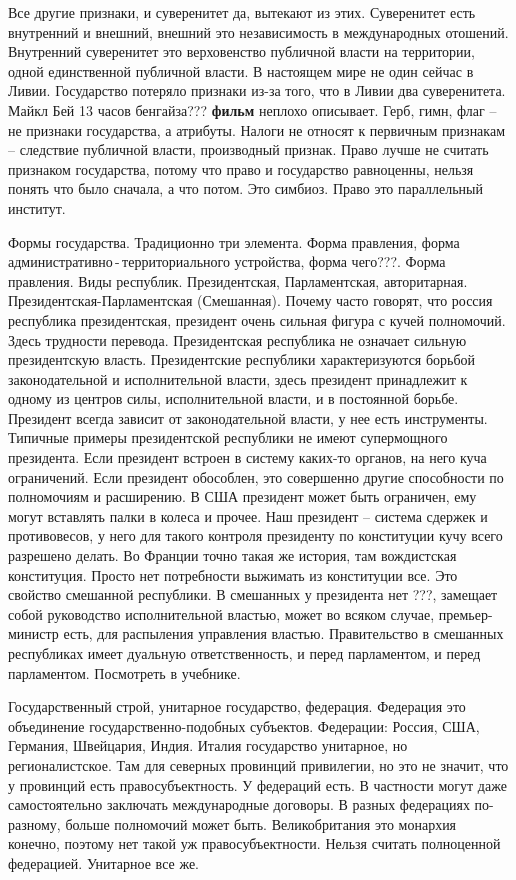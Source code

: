 \documentclass[a4paper, 12pt]{article}
\begin{document}
Все другие признаки, и суверенитет да, вытекают из этих. Суверенитет есть внутренний и внешний, внешний это независимость в международных отошений. Внутренний суверенитет это верховенство публичной власти на территории, одной единственной публичной власти. В настоящем мире не один сейчас в Ливии. Государство потеряло признаки из-за того, что в Ливии два суверенитета. Майкл Бей 13 часов бенгайза??? \textbf{фильм} неплохо описывает. Герб, гимн, флаг -- не признаки государства, а атрибуты. Налоги не относят к первичным признакам -- следствие публичной власти, производный признак. Право лучше не считать признаком государства, потому что право и государство равноценны, нельзя понять что было сначала, а что потом. Это симбиоз. Право это параллельный институт. 

Формы государства. Традиционно три элемента. Форма правления, форма административно\,\!-\,\!территориального устройства, форма чего???. Форма правления. Виды республик. Президентская, Парламентская, авторитарная. Президентская-Парламентская (Смешанная). Почему часто говорят, что россия республика президентская, президент очень сильная фигура с кучей полномочий. Здесь трудности перевода. Президентская республика не означает сильную президентскую власть. Президентские республики характеризуются борьбой законодательной и исполнительной власти, здесь президент принадлежит к одному из центров силы, исполнительной власти, и в постоянной борьбе. Президент всегда зависит от законодательной власти, у нее есть инструменты. Типичные примеры президентской республики не имеют супермощного президента. Если президент встроен в систему каких-то органов, на него куча ограничений. Если президент обособлен, это совершенно другие способности по полномочиям и расширению. В США президент может быть ограничен, ему могут вставлять палки в колеса и прочее. Наш президент -- система сдержек и противовесов, у него для такого контроля президенту по конституции кучу всего разрешено делать. Во Франции точно такая же история, там вождистская конституция. Просто нет потребности выжимать из конституции все. Это свойство смешанной республики. В смешанных у президента нет ???, замещает собой руководство исполнительной властью, может во всяком случае, премьер-министр есть, для распыления управления властью. Правительство в смешанных республиках имеет дуальную ответственность, и перед парламентом, и перед парламентом. Посмотреть в учебнике. 


Государственный строй, унитарное государство, федерация. Федерация это объединение государственно-подобных субъектов. Федерации: Россия, США, Германия, Швейцария, Индия. Италия государство унитарное, но регионалистское. Там для северных провинций привилегии, но это не значит, что у провинций есть правосубъектность. У федераций есть. В частности могут даже самостоятельно заключать международные договоры. В разных федерациях по-разному, больше полномочий может быть. Великобритания это монархия конечно, поэтому нет такой уж правосубъектности. Нельзя считать полноценной федерацией. Унитарное все же. 
\end{document}
